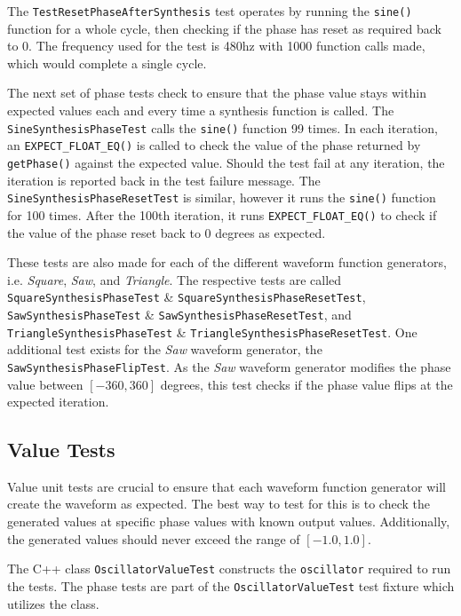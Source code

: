 \documentclass[a4paper,12pt]{report}
\begin{document}
The \texttt{Test\-Reset\-Phase\-After\-Synthesis} test operates by running the \texttt{sine()} function for a whole cycle, then checking if the phase has reset as required back to 0. The frequency used for the test is 480hz with 1000 function calls made, which would complete a single cycle.

The next set of phase tests check to ensure that the phase value stays within expected values each and every time a synthesis function is called. The \texttt{Sine\-Synthesis\-Phase\-Test} calls the \texttt{sine()} function 99 times. In each iteration, an \texttt{EXPECT\_FLOAT\_EQ()} is called to check the value of the phase returned by \texttt{getPhase()} against the expected value. Should the test fail at any iteration, the iteration is reported back in the test failure message. The \texttt{Sine\-Synthesis\-Phase\-Reset\-Test} is similar, however it runs the \texttt{sine()} function for 100 times. After the 100th iteration, it runs \texttt{EXPECT\-\_FLOAT\-\_EQ()} to check if the value of the phase reset back to 0 degrees as expected.

These tests are also made for each of the different waveform function generators, i.e. \emph{Square}, \emph{Saw}, and \emph{Triangle}. The respective tests are called \texttt{Square\-Synthesis\-Phase\-Test} \& \texttt{Square\-Synthesis\-Phase\-Reset\-Test}, \texttt{Saw\-Synthesis\-Phase\-Test} \& \texttt{Saw\-Synthesis\-Phase\-Reset\-Test}, and \texttt{Triangle\-Synthesis\-Phase\-Test} \& \texttt{Triangle\-Synthesis\-Phase\-Reset\-Test}. One additional test exists for the \emph{Saw} waveform generator, the \texttt{Saw\-Synthesis\-Phase\-Flip\-Test}. As the \emph{Saw} waveform generator modifies the phase value between $[-360,360]$ degrees, this test checks if the phase value flips at the expected iteration.

\subsection{Value Tests}
\label{subsec:valuetests}
Value unit tests are crucial to ensure that each waveform function generator will create the waveform as expected. The best way to test for this is to check the generated values at specific phase values with known output values. Additionally, the generated values should never exceed the range of $[-1.0,1.0]$.

The C++ class \texttt{Oscillator\-Value\-Test} constructs the \texttt{oscillator} required to run the tests. The phase tests are part of the \texttt{Oscillator\-Value\-Test} test fixture which utilizes the class.
\end{document}
